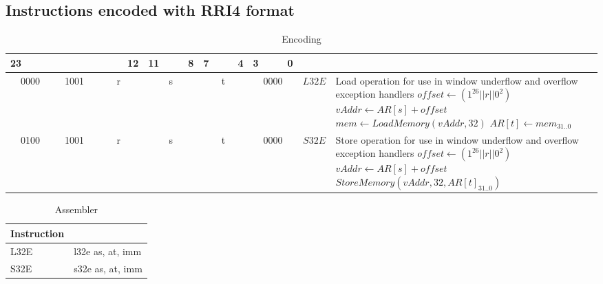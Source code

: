 \subsection{Instructions encoded with RRI4 format}
\begin{longtable}{llllllllllllllllllllllll  p{1cm}  p{7cm} | }
	\caption{Encoding\label{long}}\\
	23 & & & & & & & & & & & 12 & 11 & & & 8 & 7 & & & 4 & 3 & & & 0 & &
	\multicolumn{1}{c}{}\\
	\hline
	\multicolumn{4}{|c|}{0000} & \multicolumn{4}{c|}{1001} & \multicolumn{4}{c|}{r} & \multicolumn{4}{c|}{s} & \multicolumn{4}{c|}{t} & \multicolumn{4}{c|}{0000} & \multicolumn{1}{c|}{$L32E$} & Load operation for use in window underflow and overflow exception handlers \newline $offset \leftarrow (1^{26}||r||0^2)$ \newline $vAddr \leftarrow AR[s] + offset$ \newline $mem \leftarrow LoadMemory(vAddr, 32)$ \newline $AR[t] \leftarrow mem_{31..0}$ \\ \hline
	\multicolumn{4}{|c|}{0100} & \multicolumn{4}{c|}{1001} & \multicolumn{4}{c|}{r} & \multicolumn{4}{c|}{s} & \multicolumn{4}{c|}{t} & \multicolumn{4}{c|}{0000} & \multicolumn{1}{c|}{$S32E$} & Store operation for use in window underflow and overflow exception handlers \newline $offset \leftarrow (1^{26}||r||0^2)$ \newline $vAddr \leftarrow AR[s] + offset$ \newline $StoreMemory(vAddr, 32, AR[t]_{31..0})$ \\ \hline
\end{longtable}

\begin{longtable}{|p{5cm}|p{5cm}|}
	\caption{Assembler\label{long}}\\		
	\hline
	Instruction & \\
	\hline
	L32E & l32e as, at, imm\\ \hline
	S32E & s32e as, at, imm\\ \hline
\end{longtable}